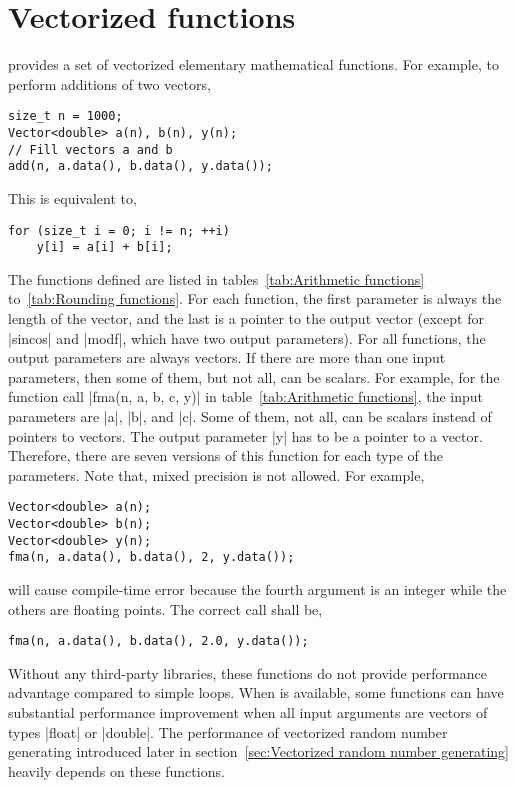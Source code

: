 \section{Vectorized functions}
\label{sec:Vectorized functions}

\mckl provides a set of vectorized elementary mathematical functions. For
example, to perform additions of two vectors,
\begin{verbatim}
size_t n = 1000;
Vector<double> a(n), b(n), y(n);
// Fill vectors a and b
add(n, a.data(), b.data(), y.data());
\end{verbatim}
This is equivalent to,
\begin{verbatim}
for (size_t i = 0; i != n; ++i)
    y[i] = a[i] + b[i];
\end{verbatim}
The functions defined are listed in tables~\ref{tab:Arithmetic functions}
to~\ref{tab:Rounding functions}. For each function, the first parameter is
always the length of the vector, and the last is a pointer to the output vector
(except for |sincos| and |modf|, which have two output parameters). For all
functions, the output parameters are always vectors. If there are more than one
input parameters, then some of them, but not all, can be scalars. For example,
for the function call |fma(n, a, b, c, y)| in table~\ref{tab:Arithmetic
functions}, the input parameters are |a|, |b|, and |c|. Some of them, not all,
can be scalars instead of pointers to vectors. The output parameter |y| has to
be a pointer to a vector. Therefore, there are seven versions of this function
for each type of the parameters. Note that, mixed precision is not allowed. For
example,
\begin{verbatim}
Vector<double> a(n);
Vector<double> b(n);
Vector<double> y(n);
fma(n, a.data(), b.data(), 2, y.data());
\end{verbatim}
will cause compile-time error because the fourth argument is an integer while
the others are floating points. The correct call shall be,
\begin{verbatim}
fma(n, a.data(), b.data(), 2.0, y.data());
\end{verbatim}
Without any third-party libraries, these functions do not provide performance
advantage compared to simple loops. When \mkl is available, some functions can
have substantial performance improvement when all input arguments are vectors
of types |float| or |double|. The performance of vectorized random number
generating introduced later in section~\ref{sec:Vectorized random number
generating} heavily depends on these functions.

